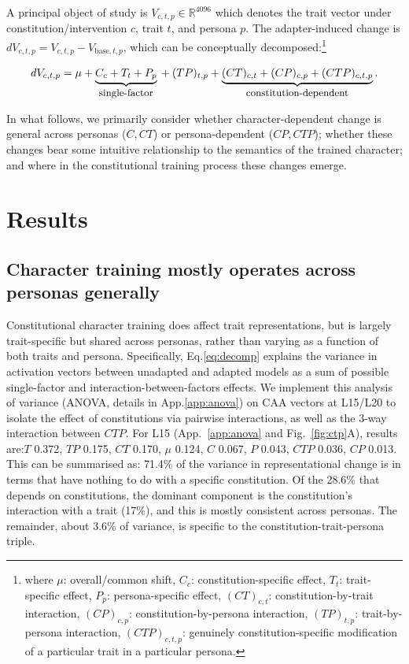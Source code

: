 \documentclass{article}
\begin{document}
A principal object of study is $V_{c,t,p}\in\mathbb{R}^{4096}$ which denotes the trait vector under constitution/intervention $c$, trait $t$, and persona $p$. The adapter-induced change is $dV_{c,t,p}=V_{c,t,p}-V_{\mathrm{base},t,p}$, which can be conceptually decomposed:\footnote{where $\mu$: overall/common shift, 
\(C_c\): constitution-specific effect, 
\(T_t\): trait-specific effect, 
\(P_p\): persona-specific effect, 
\((CT)_{c,t}\): constitution-by-trait interaction, 
\((CP)_{c,p}\): constitution-by-persona interaction, 
\((TP)_{t,p}\): trait-by-persona interaction, 
\((CTP)_{c,t,p}\): genuinely constitution-specific modification of a particular trait in a particular persona.}

\begin{equation}
\label{eq:decomp}
dV_{c,t,p}
=
\mu
+ \underbrace{C_c + T_t + P_p}_{\text{\footnotesize single-factor}}{}
+ (TP)_{t,p}
+ \underbrace{(CT)_{c,t} + (CP)_{c,p} + (CTP)_{c,t,p}}_{\text{\footnotesize constitution-dependent}}.
\end{equation}

In what follows, we primarily consider whether character-dependent change is general across personas (\(C,CT\)) or persona-dependent (\(CP,CTP\)); whether these changes bear some intuitive relationship to the semantics of the trained character; and where in the constitutional training process these changes emerge.

\section{Results}

\subsection{Character training mostly operates across personas generally}
\label{sec:ctp-tiny}
Constitutional character training does affect trait representations, but is largely trait-specific but shared across personas, rather than varying as a function of both traits and persona. Specifically, Eq.\ref{eq:decomp} explains the variance in activation vectors between unadapted and adapted models as a sum of possible single-factor and interaction-between-factors effects. We implement this analysis of variance (ANOVA, details in App.\ref{app:anova}) on CAA vectors at L15/L20 to isolate the effect of constitutions via pairwise interactions, as well as the 3-way interaction between $CTP$. For L15 (App.~\ref{app:anova} and Fig.~\ref{fig:ctp}A), results are:$T$ 0.372, $TP$ 0.175, $CT$ 0.170, $\mu$ 0.124, $C$ 0.067, $P$ 0.043, $CTP$ 0.036, $CP$ 0.013. This can be summarised as: 71.4\% of the variance in representational change is in terms that have nothing to do with a specific constitution. Of the 28.6\% that depends on constitutions, the dominant component is the constitution's interaction with a trait (17\%), and this is mostly consistent across personas. The remainder, about 3.6\% of variance, is specific to the constitution-trait-persona triple.
\end{document}
